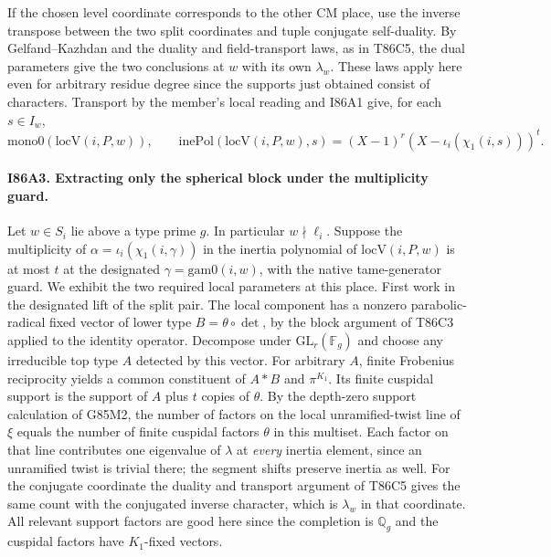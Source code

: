 If the chosen level coordinate corresponds to the other CM
place, use the inverse transpose between the two split coordinates
and tuple conjugate self-duality. By Gelfand--Kazhdan and the
duality and field-transport laws, as in T86C5, the dual parameters
give the two conclusions at $w$ with its own $\lambda_w$.
These laws apply here even for arbitrary residue degree since the
supports just obtained consist of characters. Transport by the
member's local reading and I86A1 give, for each $s\in I_w$,
\[
 \mathrm{mono0}(\mathrm{locV}(i,P,w)),\qquad
 \mathrm{inePol}(\mathrm{locV}(i,P,w),s)
       =(X-1)^r (X-\iota_i(\chi_1(i,s)))^t .
\]

\paragraph{I86A3. Extracting only the spherical block under the multiplicity guard.}
Let $w\in S_i$ lie above a type prime $g$. In particular
$w\nmid\ell_i$. Suppose the multiplicity of
$\alpha=\iota_i(\chi_1(i,\gamma))$ in the inertia polynomial
of $\mathrm{locV}(i,P,w)$ is at most $t$ at the designated
$\gamma=\mathrm{gam0}(i,w)$, with the native tame-generator
guard. We exhibit the two required local parameters at this
place. First work in the designated lift of the split pair.
The local component has a nonzero parabolic-radical fixed
vector of lower type $B=\theta\circ\det$, by the block argument
of T86C3 applied to the identity operator. Decompose under
$\mathrm{GL}_r(\mathbb F_g)$ and choose any irreducible top
type $A$ detected by this vector. For arbitrary $A$, finite
Frobenius reciprocity yields a common constituent of $A*B$ and
$\pi^{K_1}$. Its finite cuspidal support is the support of
$A$ plus $t$ copies of $\theta$. By the depth-zero support
calculation of G85M2, the number of factors on the local
unramified-twist line of $\xi$ equals the number of finite
cuspidal factors $\theta$ in this multiset. Each factor on that
line contributes one eigenvalue of $\lambda$ at \emph{every}
inertia element, since an unramified twist is trivial there;
the segment shifts preserve inertia as well. For the conjugate
coordinate the duality and transport argument of T86C5 gives
the same count with the conjugated inverse character, which is
$\lambda_w$ in that coordinate. All relevant support factors
are good here since the completion is $\mathbb Q_g$ and the
cuspidal factors have $K_1$-fixed vectors.

